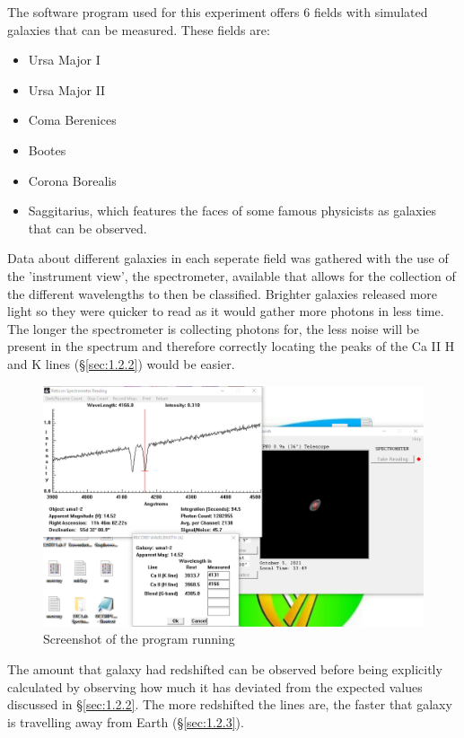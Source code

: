 \documentclass[12pt]{article}
\begin{document}
The software program used for this experiment offers 6 fields with simulated galaxies that can be measured. These fields are:

\begin{itemize}
    \item Ursa Major I
    \item Ursa Major II
    \item Coma Berenices
    \item Bootes
    \item Corona Borealis
    \item Saggitarius, which features the faces of some famous physicists as galaxies that can be observed.
\end{itemize}

Data about different galaxies in each seperate field was gathered with the use of the 'instrument view', the spectrometer, available that allows for the collection of the different
wavelengths to then be classified. Brighter galaxies released more light so they were quicker to read as it would gather more photons in less time. The longer
the spectrometer is collecting photons for, the less noise will be present in the spectrum and therefore correctly locating the peaks of the Ca II H and K lines (§\ref{sec:1.2.2}) would be easier.

\begin{figure}[H]
    \centering
    \includegraphics[width=15cm]{URSA1 program.png}
    \caption{\centering \footnotesize{Screenshot of the program running}}
    \label{fig:program}
\end{figure}

The amount that galaxy had redshifted can be observed before being explicitly calculated by observing how much it has deviated from the expected values discussed in §\ref{sec:1.2.2}.
The more redshifted the lines are, the faster that galaxy is travelling away from Earth (§\ref{sec:1.2.3}).
\end{document}
